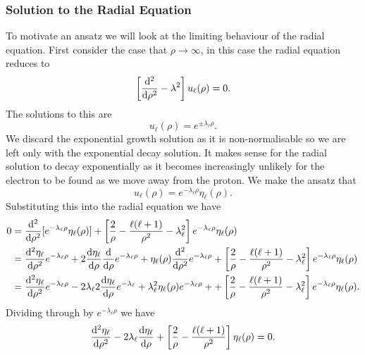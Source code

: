 \subsubsection{Solution to the Radial Equation}
To motivate an ansatz we will look at the limiting behaviour of the radial equation.
First consider the case that \(\rho \to \infty\), in this case the radial equation reduces to
\[\left[\dv[2]{\rho} - \lambda^2\right]u_\ell(\rho) = 0.\]
The solutions to this are
\[u_\ell(\rho) = e^{\pm\lambda_\ell\rho}.\]
We discard the exponential growth solution as it is non-normalisable so we are left only with the exponential decay solution.
It makes sense for the radial solution to decay exponentially as it becomes increasingly unlikely for the electron to be found as we move away from the proton.
We make the ansatz that
\[u_\ell(\rho) = e^{-\lambda_\ell\rho}\eta_\ell(\rho).\]
Substituting this into the radial equation we have
\begin{align*}
    0 &= \dv[2]{\rho}[e^{-\lambda_\ell\rho}\eta_\ell(\rho)] + \left[\frac{2}{\rho} - \frac{\ell(\ell + 1)}{\rho^2} - \lambda_\ell^2\right]e^{-\lambda_\ell\rho}\eta_\ell(\rho)\\
    &= \dv[2]{\eta_\ell}{\rho}e^{-\lambda_\ell\rho} + 2\dv{\eta_\ell}{\rho}\dv{\rho}e^{-\lambda_\ell\rho} + \eta_\ell(\rho)\dv[2]{\rho}e^{-\lambda_\ell\rho} + \left[\frac{2}{\rho} - \frac{\ell(\ell + 1)}{\rho^2} - \lambda_\ell^2\right]e^{-\lambda_\ell\rho}\eta_\ell(\rho)\\
    &= \dv[2]{\eta_\ell}{\rho}e^{-\lambda_\ell\rho} -2\lambda_\ell 2\dv{\eta_\ell}{\rho}e^{-\lambda_\ell} + \lambda_\ell^2\eta_\ell(\rho)e^{-\lambda_\ell\rho} + + \left[\frac{2}{\rho} - \frac{\ell(\ell + 1)}{\rho^2} - \lambda_\ell^2\right]e^{-\lambda_\ell\rho}\eta_\ell(\rho).\\
\end{align*}
Dividing through by \(e^{-\lambda_\ell\rho}\) we have
\begin{equation}\label{eqn:radial eqn in eta}
    \dv[2]{\eta_\ell}{\rho} - 2\lambda_\ell\dv{\eta_\ell}{\rho} +  \left[\frac{2}{\rho} - \frac{\ell(\ell + 1)}{\rho^2}\right]\eta_\ell(\rho) = 0.
\end{equation}

